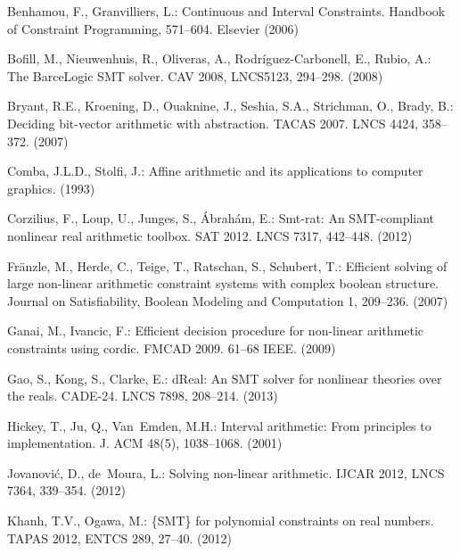 \documentclass[runningheads,a4paper,oribibl]{llncs}
\begin{document}
\begin{thebibliography}{10}
\providecommand{\url}[1]{\texttt{#1}}
\providecommand{\urlprefix}{URL }

  Benhamou, F., Granvilliers, L.: {Continuous and Interval Constraints}.
  {Handbook of Constraint Programming}, 571--604. {Elsevier} (2006)

Bofill, M., Nieuwenhuis, R., Oliveras, A., Rodríguez-Carbonell, E., Rubio, A.:
The BarceLogic SMT solver.
CAV 2008, LNCS5123, 294--298. (2008)

Bryant, R.E., Kroening, D., Ouaknine, J., Seshia, S.A., Strichman, O., Brady,
B.: Deciding bit-vector arithmetic with abstraction.
TACAS 2007. 
LNCS 4424,  358--372. (2007)

Comba, J.L.D., Stolfi, J.: Affine arithmetic and its applications to computer
graphics. (1993)

  Corzilius, F., Loup, U., Junges, S., Ábrahám, E.: Smt-rat:
  An SMT-compliant nonlinear real arithmetic toolbox.
SAT 2012. LNCS 7317,  442--448. (2012)

Fränzle, M., Herde, C., Teige, T., Ratschan, S., Schubert, T.: Efficient
  solving of large non-linear arithmetic constraint systems with complex
  boolean structure. Journal on Satisfiability, Boolean Modeling and
  Computation  1,  209--236. (2007)

Ganai, M., Ivancic, F.: Efficient decision procedure for non-linear arithmetic
constraints using cordic.
FMCAD 2009.  61--68 {IEEE}. (2009)

  Gao, S., Kong, S., Clarke, E.:
  dReal: An SMT solver for nonlinear theories over the reals.
CADE-24. LNCS 7898,  208--214. (2013)

  Hickey, T., Ju, Q., Van~Emden, M.H.:
  Interval arithmetic: From principles to implementation.
  J. ACM  48(5),  1038--1068. (2001)

  Jovanović, D., de~Moura, L.: Solving non-linear arithmetic.
  IJCAR 2012, LNCS 7364,  339--354. (2012)

Khanh, T.V., Ogawa, M.: \{SMT\} for polynomial constraints on real numbers.
TAPAS 2012, ENTCS 289, 27--40. (2012)


\end{thebibliography}
\end{document}

